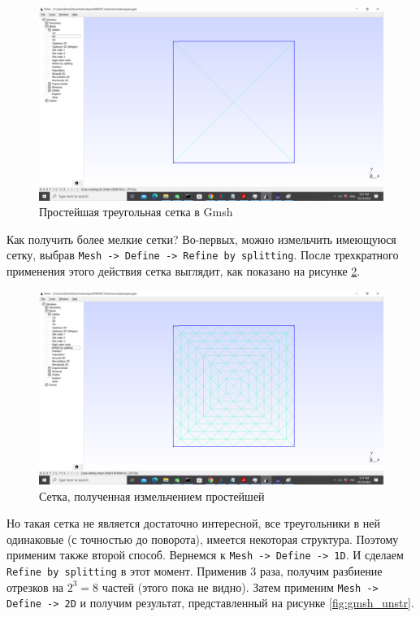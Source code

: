 \documentclass[a4paper, 11pt]{article}
\begin{document}
\begin{figure}[h] \centering
	\includegraphics[scale=0.4]{gmsh_uniform_1.png}
	\caption{Простейшая треугольная сетка в Gmsh\label{fig:gmsh_uniform_1}}
\end{figure}

Как получить более мелкие сетки? Во-первых, можно измельчить имеющуюся сетку, выбрав \texttt{Mesh -> Define -> Refine by splitting}. После трехкратного применения этого действия сетка выглядит, как показано на рисунке \ref{fig:gmsh_uniform_1_refine3}.

\begin{figure}[h] \centering
	\includegraphics[scale=0.4]{gmsh_uniform_1_refine3.png}
	\caption{Сетка, полученная измельчением простейшей\label{fig:gmsh_uniform_1_refine3}}
\end{figure}

Но такая сетка не является достаточно интересной, все треугольники в ней одинаковые (с точностью до поворота), имеется некоторая структура. Поэтому применим также второй способ. Вернемся к \texttt{Mesh -> Define -> 1D}. И сделаем \texttt{Refine by splitting} в этот момент. Применив 3 раза, получим разбиение отрезков на $2^3 = 8$ частей (этого пока не видно). Затем применим \texttt{Mesh -> Define -> 2D} и получим результат, представленный на рисунке \ref{fig:gmsh_unstr}.
\end{document}
